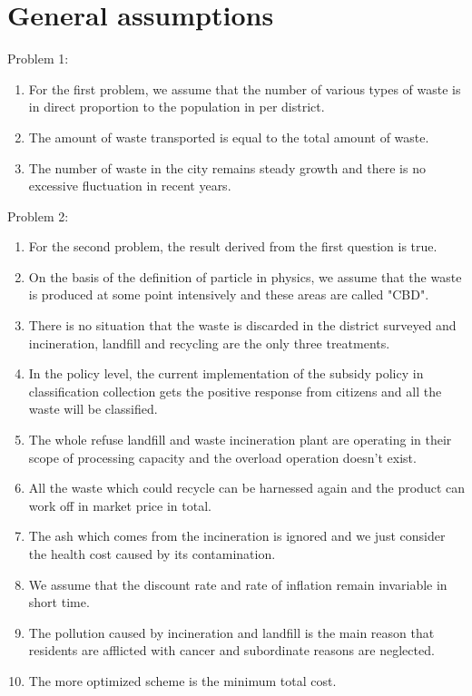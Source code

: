 \documentclass[UTF8]{article}
\begin{document}
\section{General assumptions}
\noindent Problem 1:\\
\begin{enumerate}
\item For the first problem, we assume that the number of various types of waste is in direct proportion to the population in per district.\\
\item The amount of waste transported is equal to the total amount of waste.\\
\item The number of waste in the city remains steady growth and there is no excessive fluctuation in recent years.
\end{enumerate}
Problem 2:\\
\begin{enumerate}
\item For the second problem, the result derived from the first question is true.\\
\item On the basis of the definition of particle in physics, we assume that the waste is produced at some point intensively and these areas are called "CBD".\\
\item There is no situation that the waste is discarded in the district surveyed and incineration, landfill and recycling are the only three treatments.\\
\item In the policy level, the current implementation of the subsidy policy in classification collection gets the positive response from citizens and all the waste will be classified.\\
\item The whole refuse landfill and waste incineration plant are operating in their scope of processing capacity and the overload operation doesn’t exist.\\
\item All the waste which could recycle can be harnessed again and the product can work off in market price in total.\\
\item The ash which comes from the incineration is ignored and we just consider the health cost caused by its contamination.\\
\item We assume that the discount rate and rate of inflation remain invariable in short time.\\
\item The pollution caused by incineration and landfill is the main reason that residents are afflicted with cancer and subordinate reasons are neglected.\\
\item The more optimized scheme is the minimum total cost.
\end{enumerate}
\end{document}
